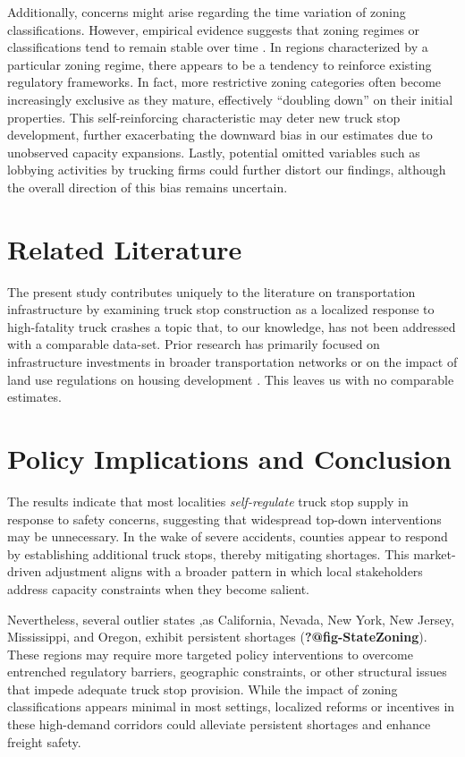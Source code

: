 \documentclass[
  12pt]{article}
\begin{document}
Additionally, concerns might arise regarding the time variation of
zoning classifications. However, empirical evidence suggests that zoning
regimes or classifications tend to remain stable over time
\citep{mclaughlinLandUseRegulation2012}. In regions characterized by a
particular zoning regime, there appears to be a tendency to reinforce
existing regulatory frameworks. In fact, more restrictive zoning
categories often become increasingly exclusive as they mature,
effectively ``doubling down'' on their initial properties. This
self-reinforcing characteristic may deter new truck stop development,
further exacerbating the downward bias in our estimates due to
unobserved capacity expansions. Lastly, potential omitted variables such
as lobbying activities by trucking firms could further distort our
findings, although the overall direction of this bias remains uncertain.

\section{Related Literature}\label{related-literature}

The present study contributes uniquely to the literature on
transportation infrastructure by examining truck stop construction as a
localized response to high-fatality truck crashes a topic that, to our
knowledge, has not been addressed with a comparable data-set. Prior
research has primarily focused on infrastructure investments in broader
transportation networks or on the impact of land use regulations on
housing development \citet{mclaughlinLandUseRegulation2012} . This
leaves us with no comparable estimates.

\section{\texorpdfstring{\textbf{Policy Implications and
Conclusion}}{Policy Implications and Conclusion}}\label{policy-implications-and-conclusion}

The results indicate that most localities \emph{self-regulate} truck
stop supply in response to safety concerns, suggesting that widespread
top-down interventions may be unnecessary. In the wake of severe
accidents, counties appear to respond by establishing additional truck
stops, thereby mitigating shortages. This market-driven adjustment
aligns with a broader pattern in which local stakeholders address
capacity constraints when they become salient.

Nevertheless, several outlier states ,as California, Nevada, New York,
New Jersey, Mississippi, and Oregon, exhibit persistent shortages
(\textbf{?@fig-StateZoning}). These regions may require more targeted
policy interventions to overcome entrenched regulatory barriers,
geographic constraints, or other structural issues that impede adequate
truck stop provision. While the impact of zoning classifications appears
minimal in most settings, localized reforms or incentives in these
high-demand corridors could alleviate persistent shortages and enhance
freight safety.
\end{document}
